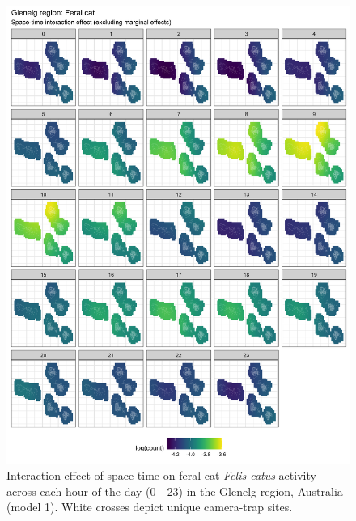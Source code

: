\documentclass[]{elsarticle} %
\begin{document}
\begin{figure}

{\centering \includegraphics[width=1\linewidth]{../figs/spte_diff_avg_g_cat} 

}

\caption{Interaction effect of space-time on feral cat \textit{Felis catus} activity across each hour of the day (0 - 23) in the Glenelg region, Australia (model 1). White crosses depict unique camera-trap sites. }\label{fig:diel-st-int-g-cat}
\end{figure}

\newpage
\end{document}
